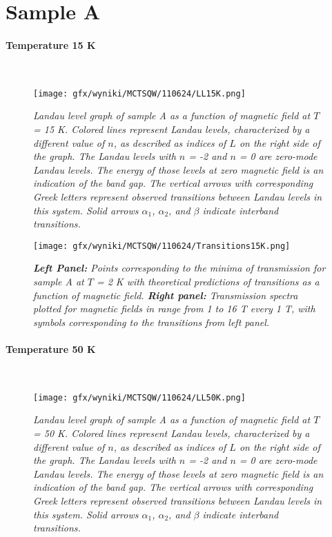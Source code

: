 \documentclass[titlepage,a4paper]{book}
\newcommand{\wciecie}{\quad\phantom{v}}
\newcommand{\myparagraph}[1]{\paragraph{#1}\mbox{}\\}
\begin{document}
\clearpage
\section{Sample A}
\myparagraph{Temperature 15 K}
\wciecie
\begin{figure}[H]
	\centering
	\texttt{[image: gfx/wyniki/MCTSQW/110624/LL15K.png]}
	\vspace{-10pt}
	\caption{\textit{Landau level graph of sample A as a function of magnetic field at $T$ = 15 K. Colored lines represent Landau levels, characterized by a different value of $n$, as described as indices of $L$ on the right side of the graph. The Landau levels with $n$ = -2 and $n$ = 0 are zero-mode Landau levels. The energy of those levels at zero magnetic field is an indication of the band gap. The vertical arrows with corresponding Greek letters represent observed transitions between Landau levels in this system. Solid arrows $\alpha_1$, $\alpha_2$, and $\beta$ indicate interband transitions.}}
	\label{fig:LL_110624_15K}
\end{figure}

\begin{figure}[H]
	\centering
	\texttt{[image: gfx/wyniki/MCTSQW/110624/Transitions15K.png]}
	\vspace{-10pt}
	\caption{\textit{\textbf{Left Panel:} Points corresponding to the minima of transmission for sample A at $T$ = 2 K with theoretical predictions of transitions as a function of magnetic field. \textbf{Right panel:} Transmission spectra plotted for magnetic fields in range from 1 to 16 T every 1 T, with symbols corresponding to the transitions from left panel.}}
	\label{fig:Transitions_110624_15K}
\end{figure}


\myparagraph{Temperature 50 K}
\wciecie
\begin{figure}[H]
	\centering
	\texttt{[image: gfx/wyniki/MCTSQW/110624/LL50K.png]}
	\vspace{-10pt}
	\caption{\textit{Landau level graph of sample A as a function of magnetic field at $T$ = 50 K. Colored lines represent Landau levels, characterized by a different value of $n$, as described as indices of $L$ on the right side of the graph. The Landau levels with $n$ = -2 and $n$ = 0 are zero-mode Landau levels. The energy of those levels at zero magnetic field is an indication of the band gap. The vertical arrows with corresponding Greek letters represent observed transitions between Landau levels in this system. Solid arrows $\alpha_1$, $\alpha_2$, and $\beta$ indicate interband transitions.}}
	\label{fig:LL_110624_50K}
\end{figure}
\end{document}
